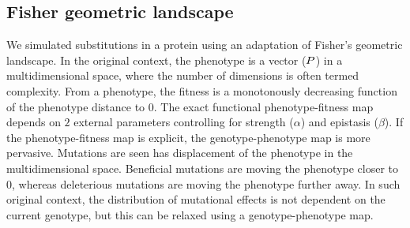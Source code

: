 \begin{table}[H]
    \centering
    \noindent{}
    \caption[Inferred amino-acid entropy for SimuPoly]{
    Estimated amino-acids entropy under simulation accounting for finite population effects, site linkage and short term fluctuation of $\Ne$.
    Obtained with the inference model of site selection for amino acid, and branch fluctuation of $\Ne$ (left column), or under the assumption of constant $\Ne$ (right column)}
\end{table}

\subsection{Fisher geometric landscape}
\label{subsec:fisher-geometric-landscape}

We simulated substitutions in a protein using an adaptation of Fisher's geometric landscape.
In the original context, the phenotype is a vector ($P$) in a multidimensional space, where the number of dimensions is often termed complexity.
From a phenotype, the fitness is a monotonously decreasing function of the phenotype distance to $0$.
The exact functional phenotype-fitness map depends on $2$ external parameters controlling for strength ($\alpha$) and epistasis ($\beta$).
If the phenotype-fitness map is explicit, the genotype-phenotype map is more pervasive.
Mutations are seen has displacement of the phenotype in the multidimensional space.
Beneficial mutations are moving the phenotype closer to $0$, whereas deleterious mutations are moving the phenotype further away.
In such original context, the distribution of mutational effects is not dependent on the current genotype, but this can be relaxed using a genotype-phenotype map.\\


